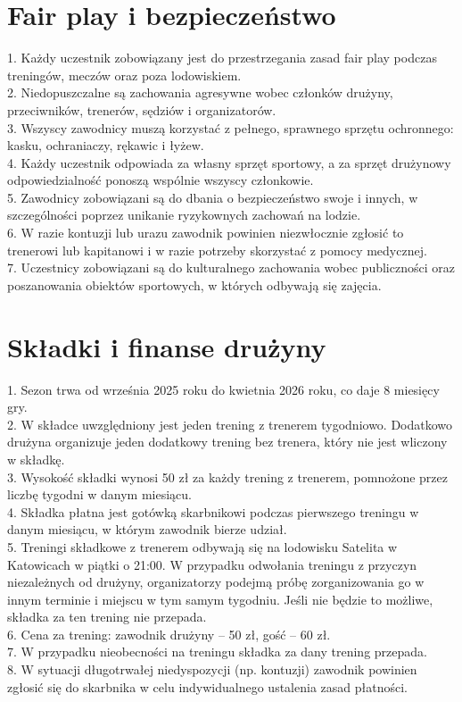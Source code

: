 \documentclass[12pt,a4paper]{article}
\begin{document}
\section{Fair play i bezpieczeństwo}
1. Każdy uczestnik zobowiązany jest do przestrzegania zasad fair play podczas treningów, meczów oraz poza lodowiskiem.\\
2. Niedopuszczalne są zachowania agresywne wobec członków drużyny, przeciwników, trenerów, sędziów i organizatorów.\\
3. Wszyscy zawodnicy muszą korzystać z pełnego, sprawnego sprzętu ochronnego: kasku, ochraniaczy, rękawic i łyżew.\\
4. Każdy uczestnik odpowiada za własny sprzęt sportowy, a za sprzęt drużynowy odpowiedzialność ponoszą wspólnie wszyscy członkowie.\\
5. Zawodnicy zobowiązani są do dbania o bezpieczeństwo swoje i innych, w szczególności poprzez unikanie ryzykownych zachowań na lodzie.\\
6. W razie kontuzji lub urazu zawodnik powinien niezwłocznie zgłosić to trenerowi lub kapitanowi i w razie potrzeby skorzystać z pomocy medycznej.\\
7. Uczestnicy zobowiązani są do kulturalnego zachowania wobec publiczności oraz poszanowania obiektów sportowych, w których odbywają się zajęcia.

\section{Składki i finanse drużyny}
1. Sezon trwa od września 2025 roku do kwietnia 2026 roku, co daje 8 miesięcy gry.\\
2. W składce uwzględniony jest jeden trening z trenerem tygodniowo. Dodatkowo drużyna organizuje jeden dodatkowy trening bez trenera, który nie jest wliczony w składkę.\\
3. Wysokość składki wynosi 50 zł za każdy trening z trenerem, pomnożone przez liczbę tygodni w danym miesiącu.\\
4. Składka płatna jest gotówką skarbnikowi podczas pierwszego treningu w danym miesiącu, w którym zawodnik bierze udział.\\
5. Treningi składkowe z trenerem odbywają się na lodowisku Satelita w Katowicach w piątki o 21:00. W przypadku odwołania treningu z przyczyn niezależnych od drużyny, organizatorzy podejmą próbę zorganizowania go w innym terminie i miejscu w tym samym tygodniu. Jeśli nie będzie to możliwe, składka za ten trening nie przepada.\\
6. Cena za trening: zawodnik drużyny -- 50 zł, gość -- 60 zł.\\
7. W przypadku nieobecności na treningu składka za dany trening przepada.\\
8. W sytuacji długotrwałej niedyspozycji (np. kontuzji) zawodnik powinien zgłosić się do skarbnika w celu indywidualnego ustalenia zasad płatności.
\end{document}
